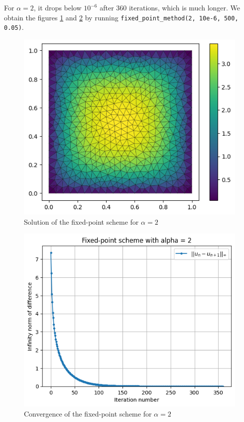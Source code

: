 \documentclass[11pt, a4paper, twoside]{article}
\begin{document}
 For $\alpha=2$, it drops below $10^{-6}$ after 360 iterations, which is much longer. We obtain the figures \ref{q2fig3} and \ref{q2fig4} by running \verb+fixed_point_method(2, 10e-6, 500, 0.05)+.
 
 \begin{figure}[H]
\centering
\includegraphics[scale = 0.7]{../Figures/fixed_sol_alpha2.png}
\caption{Solution of the fixed-point scheme for $\alpha=2$}
\label{q2fig3}
\end{figure}

\begin{figure}[H]
\centering
\includegraphics[scale = 0.7]{../Figures/fixed_conv_alpha2.png}
\caption{Convergence of the fixed-point scheme for $\alpha=2$}
\label{q2fig4}
\end{figure}
\end{document}
